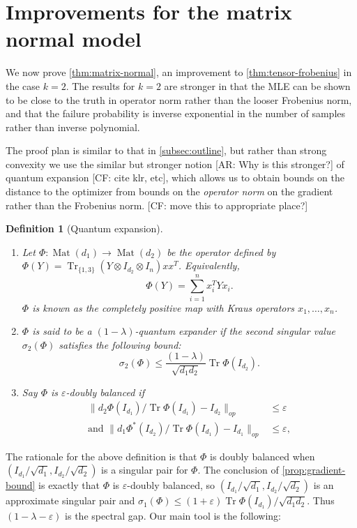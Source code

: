 \documentclass{article}
\newtheorem{definition}{Definition}
\newcommand{\ot}{\otimes}
\newcommand{\mat}{\operatorname{Mat}}
\newcommand\eps{\varepsilon}
\newcommand\samp{x}
\newcommand\tr{\operatorname{Tr}}
\newcommand{\CF}[1]{{\color{purple}[CF: #1]}}
\newcommand{\AR}[1]{{\color{orange}[AR: #1]}}
\begin{document}
\section{Improvements for the matrix normal model}\label{sec:matrix-normal}
We now prove \cref{thm:matrix-normal}, an improvement to \cref{thm:tensor-frobenius} in the case $k=2$. The results for $k = 2$ are stronger in that the MLE can be shown to be close to the truth in operator norm rather than the looser Frobenius norm, and that the failure probability is inverse exponential in the number of samples rather than inverse polynomial.




The proof plan is similar to that in \cref{subsec:outline}, but rather than strong convexity we use the similar but stronger notion \AR{Why is this stronger?} of quantum expansion \CF{cite klr, etc}, which allows us to obtain bounds on the distance to the optimizer from bounds on the \emph{operator norm} on the gradient rather than the Frobenius norm.
\CF{move this to appropriate place?}
\begin{definition}[Quantum expansion]
$ $
\begin{enumerate}
\item Let $\Phi:\mat(d_1) \to \mat(d_2)$ be the operator defined by $\Phi(Y) = \tr_{\{1,3\}} ( Y \ot I_{d_2} \ot I_{n}) \samp \samp^T$. Equivalently,
$$\Phi(Y) = \sum_{i = 1}^n \samp_i^T Y \samp_i.$$
$\Phi$ is known as the \emph{completely positive map} with Kraus operators $\samp_1, \dots, \samp_n$.
\item $\Phi$ is said to be a \emph{$(1 - \lambda)$-quantum expander} if the second singular value $\sigma_2(\Phi)$ satisfies the following bound:
$$\sigma_2(\Phi) \leq \frac{(1 - \lambda)}{\sqrt{d_1d_2}} \tr \Phi(I_{d_2}).$$
\item Say $\Phi$ is \emph{$\eps$-doubly balanced} if
\begin{align*}
\|d_2 \Phi(I_{d_1})/\tr \Phi(I_{d_1})  - I_{d_2} \|_{op}& \leq \eps\\
\textrm{and }\|d_1 \Phi^*(I_{d_2})/\tr \Phi(I_{d_1})  - I_{d_1}  \|_{op} & \leq \eps,
\end{align*}
\end{enumerate}
\end{definition}

The rationale for the above definition is that $\Phi$ is doubly balanced when $(I_{d_1}/\sqrt{d_1}, I_{d_2}/\sqrt{d_2})$ is a singular pair for $\Phi$. The conclusion of \cref{prop:gradient-bound} is exactly that $\Phi$ is $\eps$-doubly balanced, so $(I_{d_1}/\sqrt{d_1}, I_{d_2}/\sqrt{d_2})$ is an approximate singular pair and $\sigma_1(\Phi) \leq (1+\eps)  \tr \Phi(I_{d_1})/\sqrt{d_1 d_2}$. Thus $(1-\lambda - \eps)$ is the spectral gap.
Our main tool is the following:
\end{document}
